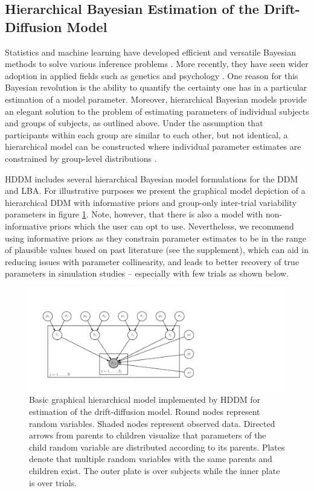 \documentclass[letterpaper,10pt,english]{article}
\begin{document}
\subsection*{Hierarchical Bayesian Estimation of the Drift-Diffusion
Model}
\label{methods:hierarchical-bayesian-estimation}
Statistics and machine learning have developed efficient and versatile
Bayesian methods to solve various inference problems
\citep{Poirier06}. More recently, they have seen wider adoption in
applied fields such as genetics \citep{StephensBalding09} and
psychology \citep{ClemensDeSelenEtAl11}. One reason for this Bayesian
revolution is the ability to quantify the certainty one has in a
particular estimation of a model parameter. Moreover, hierarchical
Bayesian models provide an elegant solution to the problem of
estimating parameters of individual subjects and groups of subjects,
as outlined above. Under the assumption that participants within each
group are similar to each other, but not identical, a hierarchical
model can be constructed where individual parameter estimates are
constrained by group-level distributions
\citep{NilssonRieskampWagenmakers11,ShiffrinLeeKim08}.

HDDM includes several hierarchical Bayesian model formulations for the DDM and LBA. For illustrative purposes we present the graphical model depiction of a hierarchical DDM with informative priors and group-only inter-trial variability parameters in figure \ref{fig.graphical}. Note, however, that there is also a model with non-informative priors which the user can opt to use. Nevertheless, we recommend using informative priors as they constrain parameter estimates to be in the range of plausible values based on past literature \citep{MatzkeWagenmakers09} (see the supplement), which can aid in reducing issues with parameter collinearity, and leads to better recovery of true parameters in simulation studies -- especially with few trials as shown below.

\begin{figure}
\centering
\includegraphics[scale=.6]{fig2.pdf}
\caption{Basic graphical hierarchical model implemented by HDDM for
estimation of the drift-diffusion model. Round nodes represent random
variables. Shaded nodes represent observed data. Directed arrows from
parents to children visualize that parameters of the child random
variable are distributed according to its   parents. Plates denote
that multiple random variables with the same   parents and children
exist. The outer plate is over subjects while the inner plate is over trials.}
\label{fig.graphical}
\end{figure}
\end{document}
